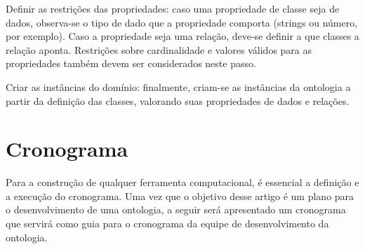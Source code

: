 Definir as restrições das propriedades: caso uma propriedade de classe seja de dados, observa-se o tipo de dado que a propriedade comporta (strings ou número, por exemplo). Caso a propriedade seja uma relação, deve-se definir a que classes a relação aponta. Restrições sobre cardinalidade e valores válidos para as propriedades também devem ser considerados neste passo.

Criar as instâncias do domínio: finalmente, criam-se as instâncias da ontologia a partir da definição das classes, valorando suas propriedades de dados e relações.

\chapter{Cronograma}\label{cap4}

Para a construção de qualquer ferramenta computacional, é essencial a definição e a execução do cronograma. Uma vez que o objetivo desse artigo é um plano para o desenvolvimento de uma ontologia, a seguir será apresentado um cronograma que servirá como guia para o cronograma da equipe de desenvolvimento da ontologia.


